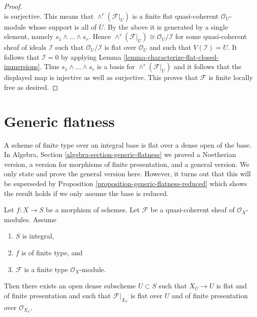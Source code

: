 \begin{proof}
$$$$
is surjective. This means that
$\wedge^r(\mathcal{F}|_U)$ is a finite flat quasi-coherent
$\mathcal{O}_U$-module whose support is all of $U$.
By the above it is generated by a single element, namely
$s_1 \wedge \ldots \wedge s_r$. Hence
$\wedge^r(\mathcal{F}|_U) \cong \mathcal{O}_U/\mathcal{I}$
for some quasi-coherent sheaf of ideals $\mathcal{I}$
such that $\mathcal{O}_U/\mathcal{I}$ is flat over $\mathcal{O}_U$ and
such that $V(\mathcal{I}) = U$.
It follows that $\mathcal{I} = 0$ by applying
Lemma \ref{lemma-characterize-flat-closed-immersions}.
Thus $s_1 \wedge \ldots \wedge s_r$ is a basis for
$\wedge^r(\mathcal{F}|_U)$ and it follows that the displayed map is injective
as well as surjective. This proves that $\mathcal{F}$ is finite locally free
as desired.
\end{proof}






\section{Generic flatness}
\label{section-generic-flatness}

\noindent
A scheme of finite type over an integral base is flat over a dense
open of the base. In
Algebra, Section \ref{algebra-section-generic-flatness}
we proved a Noetherian version, a version for morphisms of finite presentation,
and a general version. We only state and prove the general version here.
However, it turns out that this will be superseded by
Proposition \ref{proposition-generic-flatness-reduced}
which shows the result holds if we only assume the base is reduced.

\begin{proposition}
\label{proposition-generic-flatness}
Let $f : X \to S$ be a morphism of schemes.
Let $\mathcal{F}$ be a quasi-coherent sheaf of $\mathcal{O}_X$-modules.
Assume
\begin{enumerate}
\item $S$ is integral,
\item $f$ is of finite type, and
\item $\mathcal{F}$ is a finite type $\mathcal{O}_X$-module.
\end{enumerate}
Then there exists an open dense subscheme $U \subset S$ such that
$X_U \to U$ is flat and of finite presentation and such that
$\mathcal{F}|_{X_U}$ is flat over $U$ and of finite presentation
over $\mathcal{O}_{X_U}$.
\end{proposition}

